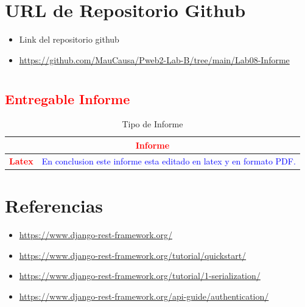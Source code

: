 \documentclass{article}
\begin{document}
  
	\section{URL de Repositorio Github}
	\begin{itemize}
		
	\end{itemize}
		
	\begin{itemize}	
		\item Link del repositorio github
        \item \url{https://github.com/MauCausa/Pweb2-Lab-B/tree/main/Lab08-Informe}
	\end{itemize}


        \vspace{5mm}
   \section{} 
  
    

	
	\subsection{\textcolor{red}{Entregable Informe}}
	\begin{table}[H]
		\caption{Tipo de Informe}
		\setlength{\tabcolsep}{0.5em} %
		{\renewcommand{\arraystretch}{1.5}%
		\begin{tabular}{|p{3cm}|p{12cm}|}
			\hline
			\multicolumn{2}{|c|}{\textbf{\textcolor{red}{Informe}}}  \\
			\hline 
			\textbf{\textcolor{red}{Latex}} & \textcolor{blue}{En conclusion este informe esta editado en latex y en formato PDF.}   \\ 
			\hline 
			
			
		\end{tabular}
	}
	\end{table}

\section{Referencias}
\begin{itemize}			
	\item \url{https://www.django-rest-framework.org/}
	\item \url{https://www.django-rest-framework.org/tutorial/quickstart/}
    \item \url{https://www.django-rest-framework.org/tutorial/1-serialization/}
    \item \url{https://www.django-rest-framework.org/api-guide/authentication/}
\end{itemize}	
	
%
%
%
			
\end{document}
